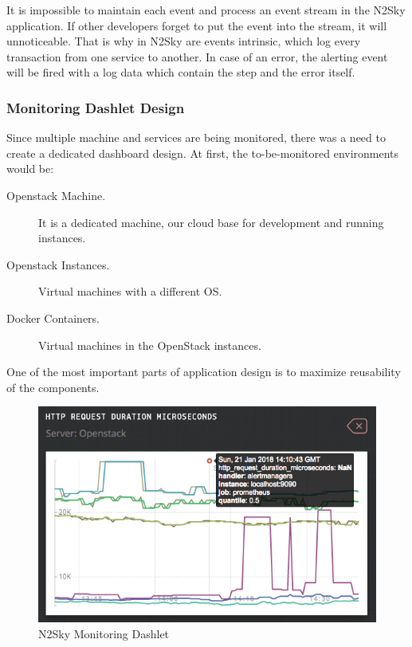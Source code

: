 It is impossible to maintain each event and process an event stream in the N2Sky application. If other developers forget to put the event into the stream, it will unnoticeable. That is why in N2Sky are events intrinsic, which log every transaction from one service to another. In case of an error, the alerting event will be fired with a log data which contain the step and the error itself.  


\subsubsection{Monitoring Dashlet Design}\label{Monitoring dashlet Design}

Since multiple machine and services are being monitored, there was a need to create a dedicated dashboard design. At first, the to-be-monitored environments would be: 
\begin{description}
\item[Openstack Machine.]  It is a dedicated machine, our cloud base for development and running instances.
\item[Openstack Instances.]   Virtual machines with a different OS.
\item[Docker Containers.]  Virtual machines in the OpenStack instances.
\end{description}

One of the most important parts of application design is to maximize reusability of the components. 

 
\begin{figure}[htbp]
\begin{center}
  \includegraphics[scale=0.65]{components/3/components/monitoring_dashlet.png}
  \caption{N2Sky Monitoring Dashlet}
  \label{fig:monitoring_dashlet}
\end{center}
\end{figure}

